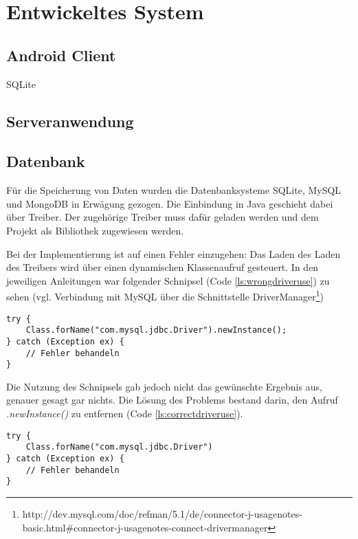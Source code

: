 
\section{Entwickeltes System}


\subsection{Android Client}

SQLite

\subsection{Serveranwendung}


\subsection{Datenbank}

Für die Speicherung von Daten wurden die Datenbanksysteme SQLite, MySQL und MongoDB in Erwägung gezogen. Die Einbindung in Java geschieht dabei über Treiber. Der zugehörige Treiber  muss dafür geladen werden und dem Projekt als Bibliothek zugewiesen werden.

Bei der Implementierung ist auf einen Fehler einzugehen: Das Laden des Laden des Treibers wird über einen dynamischen Klassenaufruf gesteuert. In den jeweiligen Anleitungen war folgender Schnipsel (Code \ref{ls:wrongdriveruse}) zu sehen (vgl. Verbindung mit MySQL über die Schnittstelle DriverManager\footnote{http://dev.mysql.com/doc/refman/5.1/de/connector-j-usagenotes-basic.html\#connector-j-usagenotes-connect-drivermanager})

\begin{lstlisting}[label=ls:wrongdriveruse,caption=Fehlerhafter dynamischer Klassenaufruf]
try {
	Class.forName("com.mysql.jdbc.Driver").newInstance();
} catch (Exception ex) {
	// Fehler behandeln
}
\end{lstlisting}

Die Nutzung des Schnipsels gab jedoch nicht das gewünschte Ergebnis aus, genauer gesagt gar nichts. Die Lösung des Problems bestand darin, den Aufruf \textit{.newInstance()} zu entfernen (Code \ref{ls:correctdriveruse}).

\begin{lstlisting}[label=ls:correctdriveruse,caption=Korrekter dynamischer Klassenaufruf]
try {
	Class.forName("com.mysql.jdbc.Driver")
} catch (Exception ex) {
	// Fehler behandeln
}
\end{lstlisting}

